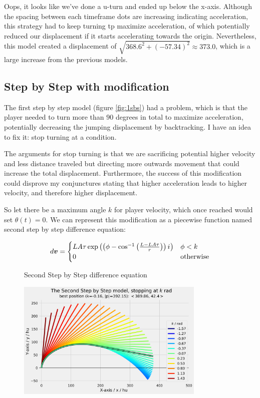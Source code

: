 Oops, it looks like we've done a u-turn and ended up below the x-axis. Although the spacing between each timeframe dots are increasing indicating acceleration, this strategy had to keep turning tp maximize acceleration, of which potentially reduced our displacement if it starts accelerating towards the origin. Nevertheless, this model created a displacement of $\sqrt{368.6^2 + (-57.34)^2} \approx 373.0$, which is a large increase from the previous models.

\subsection{Step by Step with modification}
The first step by step model (figure \ref{fig:1sbs}) had a problem, which is that the player needed to turn more than $90$ degrees in total to maximize acceleration, potentially decreasing the jumping displacement by backtracking. I have an idea to fix it: stop turning at a condition.

The arguments for stop turning is that we are sacrificing potential higher velocity and less distance traveled but directing more outwards movement that could increase the total displacement. Furthermore, the success of this modification could disprove my conjunctures stating that higher acceleration leads to higher velocity, and therefore higher displacement.

So let there be a maximum angle $k$ for player velocity, which once reached would set $\theta(t) = 0$. We can represent this modification as a piecewise function named second step by step difference equation:

\begin{figure}[H]
    \centering
    \[
        d\boldsymbol{v} = \begin{cases}
            LA\tau \exp\left(\left(\phi - \cos^{-1}\left(\frac{L-LA\tau}{r}\right)\right) {i\mkern1mu}\right) & \phi < k\\
            0 & \text{otherwise}
        \end{cases}
    \]
    \caption{Second Step by Step difference equation}
    \label{fig:ssbs}
\end{figure}



\begin{figure}[H]
    \centering
    \includegraphics[width=0.8\textwidth]{assets/step_by_step_2.png}
    \caption{}
    \label{fig:sbs2}
\end{figure}

